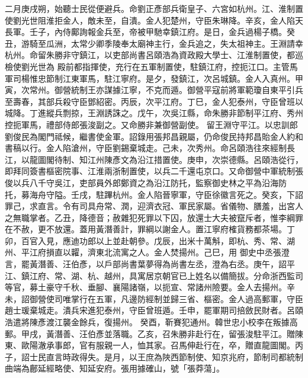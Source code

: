 \begin{pinyinscope}
 二月庚戌朔，始聽士民從便避兵。命劉正彥部兵衛皇子、六宮如杭州。江、淮制置使劉光世阻淮拒金人，敵未至，自潰。金人犯楚州，守臣朱琳降。辛亥，金人陷天長軍。壬子，內侍鄺詢報金兵至，帝被甲馳幸鎮江府。是日，金兵過楊子橋。癸丑，游騎至瓜洲，太常少卿季陵奉太廟神主行，金兵追之，失太祖神主。王淵請幸杭州。命留朱勝非守鎮江，以吏部尚書呂頤浩為資政殿大學士、江淮制置使，都巡檢使劉光世為
 殿前都指揮使，充行在五軍制置使，駐鎮江府，控扼江口。主管馬軍司楊惟忠節制江東軍馬，駐江寧府。是夕，發鎮江，次呂城鎮。金人入真州。甲寅，次常州。御營統制王亦謀據江寧，不克而遁。御營平寇前將軍範瓊自東平引兵至壽春，其部兵殺守臣鄧紹密。丙辰，次平江府。丁巳，金人犯泰州，守臣曾班以城降。丁進縱兵剽掠，王淵誘誅之。戊午，次吳江縣，命朱勝非節制平江府、秀州控扼軍馬，禮部侍郎張浚副之。又命勝非兼御營副使。
 留王淵守平江。以忠訓郎劉俊民為閣門祗候，繼書使金軍。詔錄用張邦昌親屬，仍命俊民持邦昌貽金人約和書稿以行。金人陷滄州，守臣劉錫棄城走。己未，次秀州。命呂頤浩往來經制長江，以龍圖閣待制、知江州陳彥文為沿江措置使。庚申，次崇德縣。呂頤浩從行，即拜同簽書樞密院事、江淮兩浙制置使，以兵二千還屯京口。又命御營中軍統制張俊以兵八千守吳江，吏部員外郎鄭資之為沿江防托，監察御史林之平為沿海防
 托，募海舟守隘。壬戌，駐蹕杭州。金人陷晉寧軍，守臣徐徽言死之。癸亥，下詔罪己，求直言。令有司具舟常、潤，迎濟衣冠、軍民家屬。省儀物、膳羞，出宮人之無職掌者。乙丑，降德音；赦雜犯死罪以下囚，放還士大夫被竄斥者，惟李綱罪在不赦，更不放還。蓋用黃潛善計，罪綱以謝金人。置江寧府榷貨務都茶場。丁卯，百官入見，應迪功郎以上並赴朝參。戊辰，出米十萬斛，即杭、秀、常、湖州、平江府損直以糶，濟東北流寓之人。金人焚揚州。己巳，用
 御史中丞張澄言，罷黃潛善、汪伯彥，以戶部尚書葉夢得為尚書左丞，澄為右丞。庚午，詔平江、鎮江府、常、湖、杭、越州，具寓居京朝官已上姓名以備簡拔。分命浙西監司等官，募土豪守千秋、垂腳、襄陽諸嶺，以扼宣、常諸州險要。金人去揚州。辛未，詔御營使司唯掌行在五軍，凡邊防經制並歸三省、樞密。金人過高郵軍，守臣趙士瑗棄城走。潰兵宋進犯泰州，守臣曾班遁。壬申，罷軍期司掊斂民財者。呂頤浩遣將陳彥渡江襲金餘兵，復揚州。
 癸酉，靳賽犯通州。韓世忠小校李在叛據高郵。甲戌，黃潛善、汪伯彥並落職。乙亥，召朱勝非赴行在，留張浚駐平江。贈陳東、歐陽澈承事郎，官有服親一人，恤其家。召馬伸赴行在，卒，贈直龍圖閣。丙子，詔士民直言時政得失。是月，以王庶為陜西節制使、知京兆府，節制司都統制曲端為鄜延經略使、知延安府。張用據確山，號「張莽蕩」。




\end{pinyinscope}
